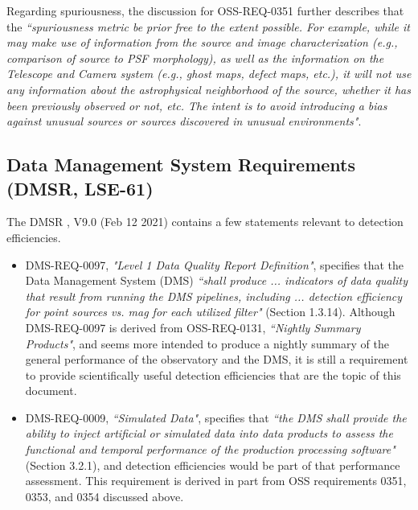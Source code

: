 Regarding spuriousness, the discussion for OSS-REQ-0351 further describes that the {\it ``spuriousness metric be prior free to the extent possible. For example, while it may make use of information from the source and image characterization (e.g., comparison of source to PSF morphology), as well as the information on the Telescope and Camera system (e.g., ghost maps, defect maps, etc.), it will not use any information about the astrophysical neighborhood of the source, whether it has been previously observed or not, etc. The intent is to avoid introducing a bias against unusual sources or sources discovered in unusual environments"}.


\subsection{Data Management System Requirements (DMSR, LSE-61)}\label{ssec:docs_dmsr}

The DMSR , V9.0 (Feb 12 2021) contains a few statements relevant to detection efficiencies. 

\begin{itemize}

\item DMS-REQ-0097, {\it "Level 1 Data Quality Report Definition"}, specifies that the Data Management System (DMS) {\it ``shall produce ... indicators of data quality that result from running the DMS pipelines, including ... detection efficiency for point sources vs. mag for each utilized filter"} (Section 1.3.14).
Although DMS-REQ-0097 is derived from OSS-REQ-0131, {\it ``Nightly Summary Products"}, and seems more intended to produce a nightly summary of the general performance of the observatory and the DMS, it is still a requirement to provide scientifically useful detection efficiencies that are the topic of this document. 

\item DMS-REQ-0009, {\it ``Simulated Data"}, specifies that {\it ``the DMS shall provide the ability to inject artificial or simulated data into data products to assess the functional and temporal performance of the production processing software"} (Section 3.2.1), and detection efficiencies would be part of that performance assessment.
This requirement is derived in part from OSS requirements 0351, 0353, and 0354 discussed above.

\end{itemize}


